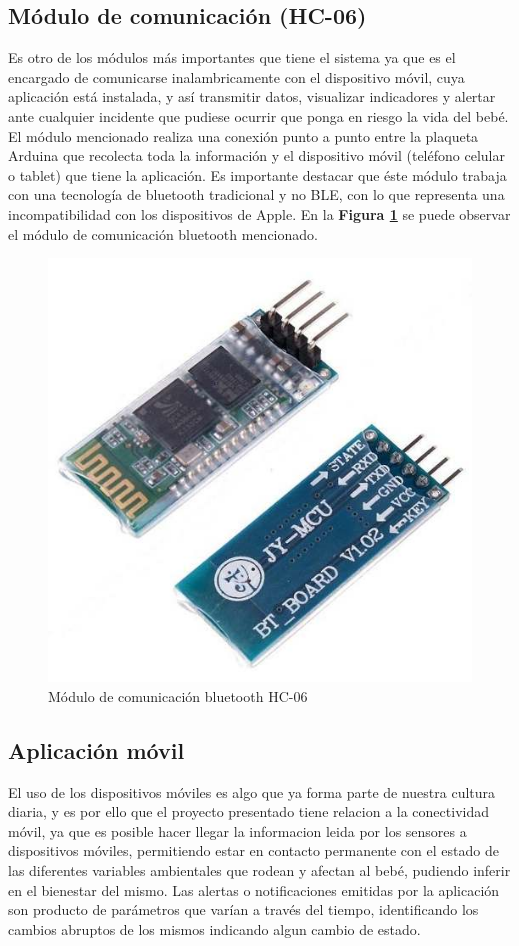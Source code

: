 \documentclass{IEEEtran}
\begin{document}
		\subsection{Módulo de comunicación (\textbf{HC-06})}

		Es otro de los módulos más importantes que tiene el sistema ya que es el encargado de comunicarse inalambricamente con el dispositivo móvil, cuya aplicación está instalada, y así transmitir datos, visualizar indicadores y alertar ante cualquier incidente que pudiese ocurrir que ponga en riesgo la vida del bebé. El módulo mencionado realiza una conexión punto a punto entre la plaqueta Arduina que recolecta toda la información y el dispositivo móvil (teléfono celular o tablet) que tiene la aplicación. Es importante destacar que éste módulo trabaja con una tecnología de bluetooth tradicional y no BLE, con lo que representa una incompatibilidad con los dispositivos de Apple. En la \textbf{Figura \ref{arduino-modulo-bluetooth}} se puede observar el módulo de comunicación bluetooth mencionado.

			\begin{figure}
				\centering
				\includegraphics[width=0.6\linewidth]{arduino-modulo-bluetooth}
				\caption{Módulo de comunicación bluetooth HC-06}
				\label{arduino-modulo-bluetooth}
			\end{figure}


		\subsection{Aplicación móvil}
		
			El uso de los dispositivos móviles es algo que ya forma parte de nuestra cultura diaria, y es por ello que el proyecto presentado tiene relacion a la conectividad móvil, ya que es posible hacer llegar la informacion leida por los sensores a dispositivos móviles, permitiendo estar en contacto permanente con el estado de las diferentes variables ambientales que rodean y afectan al bebé, pudiendo inferir en el bienestar del mismo. Las alertas o notificaciones emitidas por la aplicación son producto de parámetros que varían a través del tiempo, identificando los cambios abruptos de los mismos indicando algun cambio de estado. 
			
\end{document}
